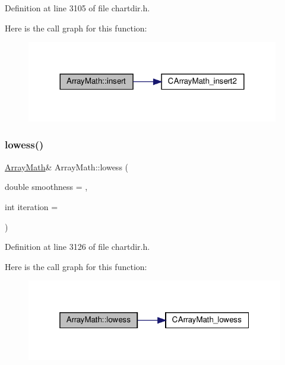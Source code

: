 Definition at line 3105 of file chartdir.\+h.

Here is the call graph for this function\+:
\nopagebreak
\begin{figure}[H]
\begin{center}
\leavevmode
\includegraphics[width=312pt]{class_array_math_a2cebd29ee37fb8f24de84cbd14cd4b46_cgraph}
\end{center}
\end{figure}
\mbox{\label{class_array_math_afc9d22a0cf7267842d76430fd0dce639}} 
\subsubsection{\texorpdfstring{lowess()}{lowess()}\hspace{0.1cm}{\footnotesize\ttfamily [1/2]}}
{\footnotesize\ttfamily \hyperlink{class_array_math}{Array\+Math}\& Array\+Math\+::lowess (\begin{DoxyParamCaption}\item[{double}]{smoothness = {},  }\item[{int}]{iteration = {} }\end{DoxyParamCaption})\hspace{0.3cm}{\ttfamily [inline]}}



Definition at line 3126 of file chartdir.\+h.

Here is the call graph for this function\+:
\nopagebreak
\begin{figure}[H]
\begin{center}
\leavevmode
\includegraphics[width=319pt]{class_array_math_afc9d22a0cf7267842d76430fd0dce639_cgraph}
\end{center}
\end{figure}
\mbox{\label{class_array_math_a7852fe7a310511ac1ba8fa585a614146}} 
